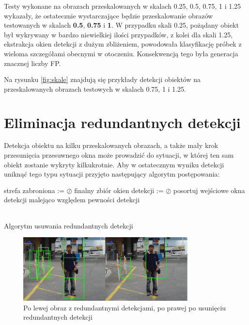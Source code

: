 Testy wykonane na obrazach przeskalowanych w skalach 0.25, 0.5, 0.75, 1 i 1.25 wykazały, że ostatecznie wystarczające będzie przeskalowanie obrazów testowanych w skalach \textbf{0.5}, \textbf{0.75} i \textbf{1}. W przypadku skali 0.25, pożądany obiekt był wykrywany w bardzo niewielkiej ilości przypadków, z kolei dla skali 1.25, ekstrakcja okien detekcji z dużym zbliżeniem, powodowała klasyfikację próbek z wieloma szczegółami obecnymi w otoczeniu. Konsekwencją tego była generacja znacznej liczby FP.

Na rysunku \ref{fig:skale} znajdują się przykłady detekcji obiektów na przeskalowanych obrazach testowych w skalach 0.75, 1 i 1.25.

\section{Eliminacja redundantnych detekcji}
\label{sec:eliminacja}

Detekcja obiektu na kilku przeskalowanych obrazach, a także mały krok przesunięcia przesuwnego okna może prowadzić do sytuacji, w której ten sam obiekt zostanie wykryty kilkukrotnie.
Aby w ostatecznym wyniku detekcji uniknąć tego typu sytuacji przyjęto następujący algorytm postępowania:
\\

\begin{algorithm}[H]
 \SetAlgoLined
 strefa zabroniona := $\oslash$\;
 finalny zbiór okien detekcji := $\oslash$\;
 posortuj wejściowe okna detekcji malejąco względem pewności detekcji\;
 
 \\
 \caption{Algorytm usuwania redundantnych detekcji}
\end{algorithm}

\begin{figure}[htb]
\centering
\includegraphics[width=0.8\textwidth]{ch3_redundant.png}
\caption{Po lewej obraz z redundantnymi detekcjami, po prawej po usunięciu redundantnych detekcji}
\label{fig:redundancje}
\end{figure}

